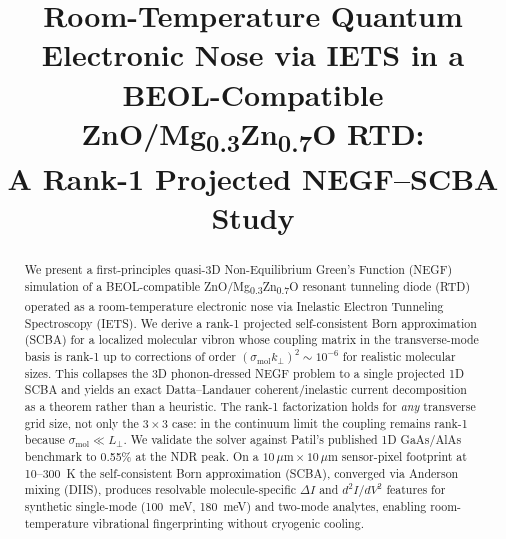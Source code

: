 \documentclass[conference]{IEEEtran}
\begin{document}
\title{Room-Temperature Quantum Electronic Nose via IETS in a\\
BEOL-Compatible ZnO/Mg\textsubscript{0.3}Zn\textsubscript{0.7}O RTD:\\
A Rank-1 Projected NEGF--SCBA Study}

\author{
\and
\IEEEauthorblockN{[Advisor]}
}

\maketitle

\begin{abstract}
We present a first-principles quasi-3D Non-Equilibrium Green's Function
(NEGF) simulation of a BEOL-compatible ZnO/Mg\textsubscript{0.3}Zn\textsubscript{0.7}O
resonant tunneling diode (RTD) operated as a room-temperature
electronic nose via Inelastic Electron Tunneling Spectroscopy (IETS). We
derive a rank-1 projected self-consistent Born approximation (SCBA) for a
localized molecular vibron whose coupling matrix in the transverse-mode
basis is rank-1 up to corrections of order
$(\sigma_{\mathrm{mol}} k_\perp)^2 \sim 10^{-6}$ for realistic
molecular sizes. This collapses the 3D phonon-dressed NEGF problem to a
single projected 1D SCBA and yields an exact Datta--Landauer
coherent/inelastic current decomposition as a theorem rather than a
heuristic. The rank-1 factorization holds for \emph{any} transverse grid
size, not only the $3\times 3$ case: in the continuum limit the coupling
remains rank-1 because $\sigma_{\mathrm{mol}} \ll L_\perp$. We validate the
solver against Patil's published 1D GaAs/AlAs benchmark to 0.55\% at the
NDR peak. On a
$10\,\mu\mathrm{m} \times 10\,\mu\mathrm{m}$ sensor-pixel footprint at
10--300~K the self-consistent Born approximation (SCBA), converged via
Anderson mixing (DIIS), produces resolvable molecule-specific
$\Delta I$ and $d^2I/dV^2$ features for synthetic single-mode (100~meV,
180~meV) and two-mode analytes, enabling room-temperature vibrational
fingerprinting without cryogenic cooling.
\end{abstract}
\end{document}
